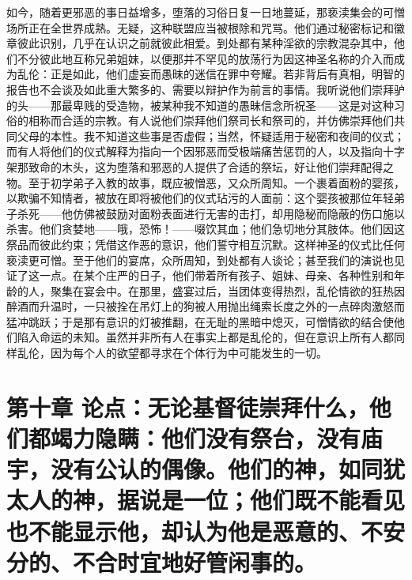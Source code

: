 如今，随着更邪恶的事日益增多，堕落的习俗日复一日地蔓延，那亵渎集会的可憎场所正在全世界成熟。无疑，这种联盟应当被根除和咒骂。他们通过秘密标记和徽章彼此识别，几乎在认识之前就彼此相爱。到处都有某种淫欲的宗教混杂其中，他们不分彼此地互称兄弟姐妹，以便那并不罕见的放荡行为因这神圣名称的介入而成为乱伦：正是如此，他们虚妄而愚昧的迷信在罪中夸耀。若非背后有真相，明智的报告也不会谈及如此重大繁多的、需要以辩护作为前言的事情。我听说他们崇拜驴的头——那最卑贱的受造物，被某种我不知道的愚昧信念所祝圣——这是对这种习俗的相称而合适的宗教。有人说他们崇拜他们祭司长和祭司的，并仿佛崇拜他们共同父母的本性。我不知道这些事是否虚假；当然，怀疑适用于秘密和夜间的仪式；而有人将他们的仪式解释为指向一个因邪恶而受极端痛苦惩罚的人，以及指向十字架那致命的木头，这为堕落和邪恶的人提供了合适的祭坛，好让他们崇拜配得之物。至于初学弟子入教的故事，既应被憎恶，又众所周知。一个裹着面粉的婴孩，以欺骗不知情者，被放在即将被他们的仪式玷污的人面前：这个婴孩被那位年轻弟子杀死——他仿佛被鼓励对面粉表面进行无害的击打，却用隐秘而隐蔽的伤口施以杀害。他们贪婪地——哦，恐怖！——啜饮其血；他们急切地分其肢体。他们因这祭品而彼此约束；凭借这作恶的意识，他们誓守相互沉默。这样神圣的仪式比任何亵渎更可憎。至于他们的宴席，众所周知，到处都有人谈论；甚至我们的演说也见证了这一点。在某个庄严的日子，他们带着所有孩子、姐妹、母亲、各种性别和年龄的人，聚集在宴会中。在那里，盛宴过后，当团体变得热烈，乱伦情欲的狂热因醉酒而升温时，一只被拴在吊灯上的狗被人用抛出绳索长度之外的一点碎肉激怒而猛冲跳跃；于是那有意识的灯被推翻，在无耻的黑暗中熄灭，可憎情欲的结合使他们陷入命运的未知。虽然并非所有人在事实上都是乱伦的，但在意识上所有人都同样乱伦，因为每个人的欲望都寻求在个体行为中可能发生的一切。\par


\section{第十章 论点：无论基督徒崇拜什么，他们都竭力隐瞒：他们没有祭台，没有庙宇，没有公认的偶像。他们的神，如同犹太人的神，据说是一位；他们既不能看见也不能显示他，却认为他是恶意的、不安分的、不合时宜地好管闲事的。}


